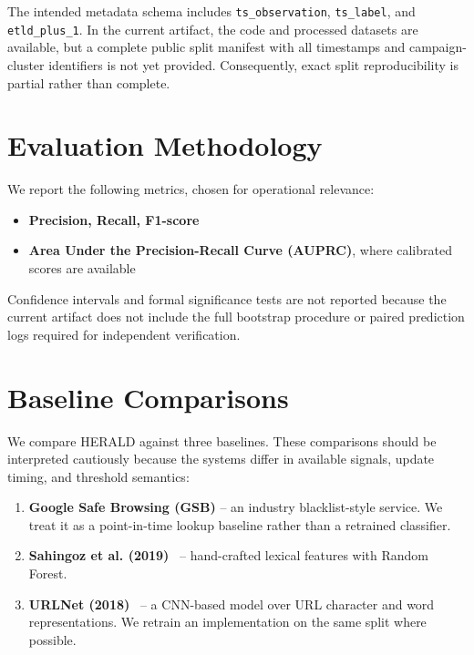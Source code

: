 \documentclass[conference]{IEEEtran}
\begin{document}
The intended metadata schema includes \texttt{ts\_observation}, \texttt{ts\_label}, and \texttt{etld\_plus\_1}. In the current artifact, the code and processed datasets are available, but a complete public split manifest with all timestamps and campaign-cluster identifiers is not yet provided. Consequently, exact split reproducibility is partial rather than complete.

\section{Evaluation Methodology}
\label{sec:evaluation}

We report the following metrics, chosen for operational relevance:

\begin{itemize}
    \item \textbf{Precision, Recall, F1-score}
    \item \textbf{Area Under the Precision-Recall Curve (AUPRC)}, where calibrated scores are available
\end{itemize}

Confidence intervals and formal significance tests are not reported because the current artifact does not include the full bootstrap procedure or paired prediction logs required for independent verification.

\section{Baseline Comparisons}
\label{sec:baselines}

We compare HERALD against three baselines. These comparisons should be interpreted cautiously because the systems differ in available signals, update timing, and threshold semantics:

\begin{enumerate}
    \item \textbf{Google Safe Browsing (GSB)} – an industry blacklist-style service. We treat it as a point-in-time lookup baseline rather than a retrained classifier.
    \item \textbf{Sahingoz et al. (2019)}~\cite{sahingoz2019} – hand-crafted lexical features with Random Forest.
    \item \textbf{URLNet (2018)}~\cite{le_urlnet} – a CNN-based model over URL character and word representations. We retrain an implementation on the same split where possible.
\end{enumerate}
\end{document}
